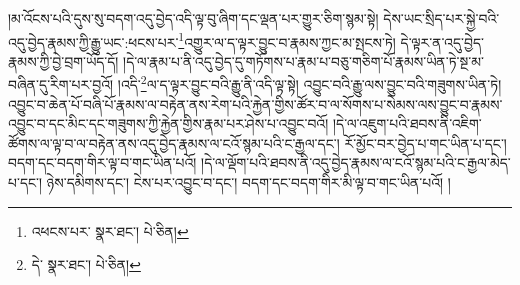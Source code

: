 །མ་འོངས་པའི་དུས་སུ་བདག་འདུ་བྱེད་འདི་ལྟ་བུ་ཞིག་དང་ལྡན་པར་གྱུར་ཅིག་སྙམ་སྟེ། དེས་ཡང་སྲིད་པར་སྐྱེ་བའི་འདུ་བྱེད་རྣམས་ཀྱི་རྒྱུ་ཡང་:ཕངས་པར་\footnote{འཕངས་པར་  སྣར་ཐང་།  པེ་ཅིན། }འགྱུར་ལ་ད་ལྟར་བྱུང་བ་རྣམས་ཀྱང་མ་སྤངས་ཏེ། དེ་ལྟར་ན་འདུ་བྱེད་རྣམས་ཀྱི་བྱེ་བྲག་ཡོད་དོ། །དེ་ལ་རྣམ་པ་ནི་འདུ་བྱེད་དུ་གཏོགས་པ་རྣམ་པ་བཅུ་གཅིག་པོ་རྣམས་ཡིན་ཏེ་སྔ་མ་བཞིན་དུ་རིག་པར་བྱའོ། །འདི་\footnote{དེ་  སྣར་ཐང་།  པེ་ཅིན། }ལ་ད་ལྟར་བྱུང་བའི་རྒྱུ་ནི་འདི་ལྟ་སྟེ། འབྱུང་བའི་རྒྱུ་ལས་བྱུང་བའི་གཟུགས་ཡིན་ཏེ། འབྱུང་བ་ཆེན་པོ་བཞི་པོ་རྣམས་ལ་བརྟེན་ནས་རེག་པའི་རྐྱེན་གྱིས་ཚོར་བ་ལ་སོགས་པ་སེམས་ལས་བྱུང་བ་རྣམས་འབྱུང་བ་དང་མིང་དང་གཟུགས་ཀྱི་རྐྱེན་གྱིས་རྣམ་པར་ཤེས་པ་འབྱུང་བའོ། །དེ་ལ་འཇུག་པའི་ཐབས་ནི་འཇིག་ཚོགས་ལ་ལྟ་བ་ལ་བརྟེན་ནས་འདུ་བྱེད་རྣམས་ལ་ངའོ་སྙམ་པའི་ང་རྒྱལ་དང་། རོ་མྱོང་བར་བྱེད་པ་གང་ཡིན་པ་དང་། བདག་དང་བདག་གིར་ལྟ་བ་གང་ཡིན་པའོ། །དེ་ལ་ལྡོག་པའི་ཐབས་ནི་འདུ་བྱེད་རྣམས་ལ་ངའོ་སྙམ་པའི་ང་རྒྱལ་མེད་པ་དང་། ཉེས་དམིགས་དང་། ངེས་པར་འབྱུང་བ་དང་། བདག་དང་བདག་གིར་མི་ལྟ་བ་གང་ཡིན་པའོ། །
